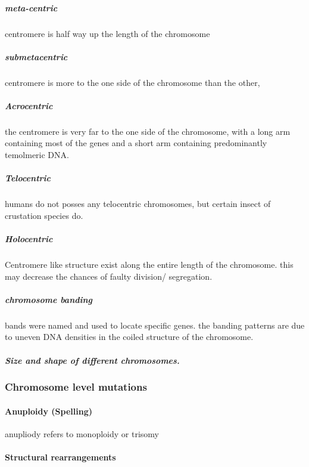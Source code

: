 \documentclass[]{article}
\let\oldparagraph\paragraph
\renewcommand{\paragraph}[1]{\oldparagraph{#1}\mbox{}}
\let\oldsubparagraph\subparagraph
\renewcommand{\subparagraph}[1]{\oldsubparagraph{#1}\mbox{}}
\begin{document}
\hypertarget{meta-centric}{%
\subparagraph{meta-centric}\label{meta-centric}}

centromere is half way up the length of the chromosome

\hypertarget{submetacentric}{%
\subparagraph{submetacentric}\label{submetacentric}}

centromere is more to the one side of the chromosome than the other,

\hypertarget{acrocentric}{%
\subparagraph{Acrocentric}\label{acrocentric}}

the centromere is very far to the one side of the chromosome, with a
long arm containing most of the genes and a short arm containing
predominantly temolmeric DNA.

\hypertarget{telocentric}{%
\subparagraph{Telocentric}\label{telocentric}}

humans do not posses any telocentric chromosomes, but certain insect of
crustation species do.

\hypertarget{holocentric}{%
\subparagraph{Holocentric}\label{holocentric}}

Centromere like structure exist along the entire length of the
chromosome. this may decrease the chances of faulty division/
segregation.

\hypertarget{chromosome-banding}{%
\subparagraph{chromosome banding}\label{chromosome-banding}}

bands were named and used to locate specific genes. the banding patterns
are due to uneven DNA densities in the coiled structure of the
chromosome.

\hypertarget{size-and-shape-of-different-chromosomes.}{%
\subparagraph{Size and shape of different
chromosomes.}\label{size-and-shape-of-different-chromosomes.}}

\hypertarget{chromosome-level-mutations}{%
\subsubsection{Chromosome level
mutations}\label{chromosome-level-mutations}}

\hypertarget{anuploidy-spelling}{%
\paragraph{Anuploidy (Spelling)}\label{anuploidy-spelling}}

anupliody refers to monoploidy or trisomy

\hypertarget{structural-rearrangements}{%
\paragraph{Structural rearrangements}\label{structural-rearrangements}}
\end{document}
